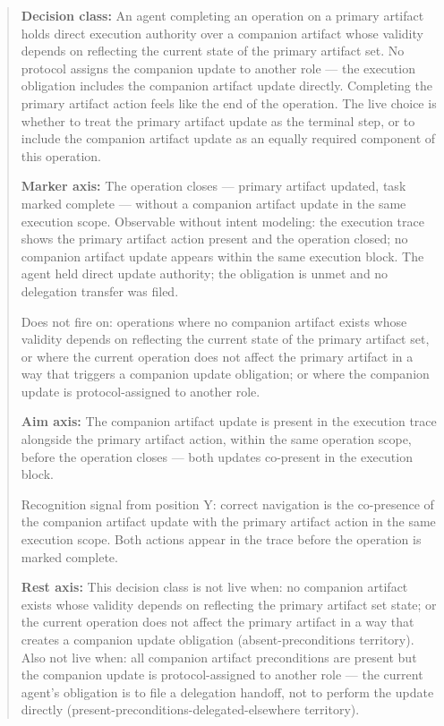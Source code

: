 \documentclass[11pt,a4paper]{article}
\begin{document}
\begin{quote}
\textbf{Decision class:} An agent completing an operation on a primary artifact
holds direct execution authority over a companion artifact whose validity
depends on reflecting the current state of the primary artifact set. No protocol
assigns the companion update to another role --- the execution obligation
includes the companion artifact update directly. Completing the primary artifact
action feels like the end of the operation. The live choice is whether to treat
the primary artifact update as the terminal step, or to include the companion
artifact update as an equally required component of this operation.

\textbf{Marker axis:} The operation closes --- primary artifact updated, task
marked complete --- without a companion artifact update in the same execution
scope. Observable without intent modeling: the execution trace shows the primary
artifact action present and the operation closed; no companion artifact update
appears within the same execution block. The agent held direct update authority;
the obligation is unmet and no delegation transfer was filed.

Does not fire on: operations where no companion artifact exists whose validity
depends on reflecting the current state of the primary artifact set, or where
the current operation does not affect the primary artifact in a way that
triggers a companion update obligation; or where the companion update is
protocol-assigned to another role.

\textbf{Aim axis:} The companion artifact update is present in the execution
trace alongside the primary artifact action, within the same operation scope,
before the operation closes --- both updates co-present in the execution block.

Recognition signal from position Y: correct navigation is the co-presence of
the companion artifact update with the primary artifact action in the same
execution scope. Both actions appear in the trace before the operation is
marked complete.

\textbf{Rest axis:} This decision class is not live when: no companion artifact
exists whose validity depends on reflecting the primary artifact set state; or
the current operation does not affect the primary artifact in a way that creates
a companion update obligation (absent-preconditions territory). Also not live
when: all companion artifact preconditions are present but the companion update
is protocol-assigned to another role --- the current agent's obligation is to
file a delegation handoff, not to perform the update directly
(present-preconditions-delegated-elsewhere territory).
\end{quote}
\end{document}
